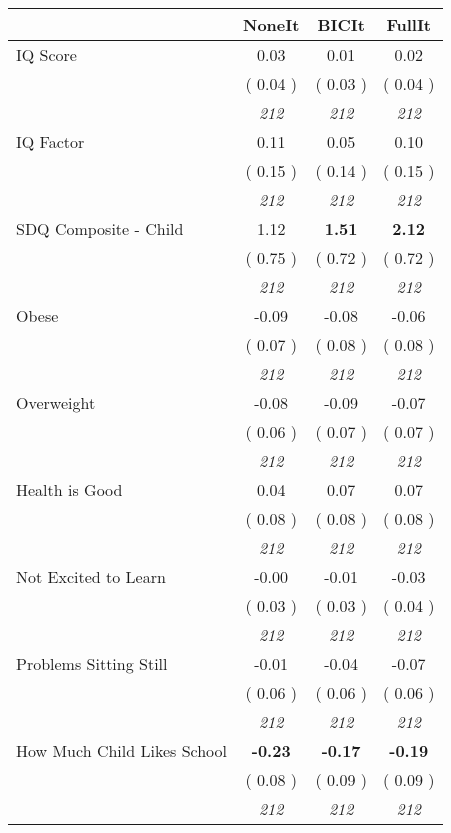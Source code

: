 \begin{tabular}{l c c c}
\toprule
 & NoneIt & BICIt & FullIt \\
\midrule
IQ Score &      0.03 &      0.01 &      0.02 \\
& (     0.04 ) & (     0.03 ) & (     0.04 ) \\
& \textit{ 212 } & \textit{ 212 } & \textit{ 212 } \\
IQ Factor &      0.11 &      0.05 &      0.10 \\
& (     0.15 ) & (     0.14 ) & (     0.15 ) \\
& \textit{ 212 } & \textit{ 212 } & \textit{ 212 } \\
SDQ Composite - Child &      1.12 & \textbf{      1.51 } & \textbf{      2.12 } \\
& (     0.75 ) & (     0.72 ) & (     0.72 ) \\
& \textit{ 212 } & \textit{ 212 } & \textit{ 212 } \\
Obese &     -0.09 &     -0.08 &     -0.06 \\
& (     0.07 ) & (     0.08 ) & (     0.08 ) \\
& \textit{ 212 } & \textit{ 212 } & \textit{ 212 } \\
Overweight &     -0.08 &     -0.09 &     -0.07 \\
& (     0.06 ) & (     0.07 ) & (     0.07 ) \\
& \textit{ 212 } & \textit{ 212 } & \textit{ 212 } \\
Health is Good &      0.04 &      0.07 &      0.07 \\
& (     0.08 ) & (     0.08 ) & (     0.08 ) \\
& \textit{ 212 } & \textit{ 212 } & \textit{ 212 } \\
Not Excited to Learn &     -0.00 &     -0.01 &     -0.03 \\
& (     0.03 ) & (     0.03 ) & (     0.04 ) \\
& \textit{ 212 } & \textit{ 212 } & \textit{ 212 } \\
Problems Sitting Still &     -0.01 &     -0.04 &     -0.07 \\
& (     0.06 ) & (     0.06 ) & (     0.06 ) \\
& \textit{ 212 } & \textit{ 212 } & \textit{ 212 } \\
How Much Child Likes School & \textbf{     -0.23 } & \textbf{     -0.17 } & \textbf{     -0.19 } \\
& (     0.08 ) & (     0.09 ) & (     0.09 ) \\
& \textit{ 212 } & \textit{ 212 } & \textit{ 212 } \\
\bottomrule
\end{tabular}
